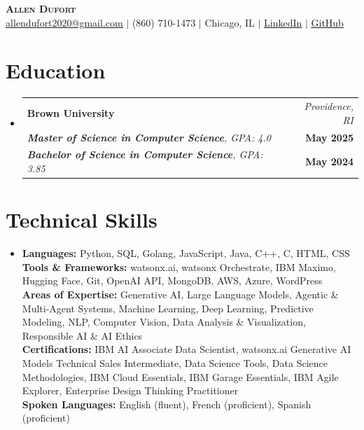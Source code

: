 \documentclass[letterpaper,10.9pt]{article}
\makeatletter
\newcommand{\resumeEdHeading}[6]{
  \item
  \begin{tabular*}{\textwidth}{l@{\extracolsep{\fill}}r}
    \textbf{#1} & \textit{\small #2} \\
    \textit{#3} & \textbf{\small #4} \\
    \textit{#5} & \textbf{\small #6} \\
  \end{tabular*}\vspace{-7pt}
}
\newcommand{\resumeSubHeadingListStart}{\begin{itemize}[leftmargin=0in, label={}]}
\newcommand{\resumeSubHeadingListEnd}{\end{itemize}}
\newcommand{\resumeItemListStart}{\begin{itemize}}
\newcommand{\resumeItemListEnd}{\end{itemize}\vspace{-5pt}}
\makeatother
\begin{document}
\begin{center}
  \textbf{\Huge \scshape Allen Dufort} \\ \vspace{8pt}
  \href{mailto:allendufort2020@gmail.com}{\faEnvelope \thinspace \thinspace \underline{allendufort2020@gmail.com}} $|$
  \faPhone \thinspace \thinspace (860) 710-1473 $|$
  \faMapMarker* \thinspace \thinspace Chicago, IL $|$
  \href{https://www.linkedin.com/in/allen-dufort/}{\faLinkedin \thinspace \thinspace \underline{LinkedIn}} $|$
  \href{https://github.com/AllenDufort}{\faGithub \thinspace \thinspace \underline{GitHub}}
\end{center}

\section{Education}
\resumeSubHeadingListStart
  \resumeEdHeading
    {Brown University}{Providence, RI}
    {\textbf{Master of Science in Computer Science}, GPA: 4.0}{May 2025}
    {\textbf{Bachelor of Science in Computer Science}, GPA: 3.85}{May 2024}
\resumeSubHeadingListEnd

\section{Technical Skills}
\resumeItemListStart[leftmargin=0in, label={}]
  \item{
    \textbf{Languages:}\small{ Python, SQL, Golang, JavaScript, Java, C++, C, HTML, CSS} \\
    \textbf{Tools \& Frameworks:}\small{ watsonx.ai, watsonx Orchestrate, IBM Maximo, Hugging Face, Git, OpenAI API, MongoDB, AWS, Azure, WordPress} \\
    \textbf{Areas of Expertise:}\small{ Generative AI, Large Language Models, Agentic \& Multi-Agent Systems, Machine Learning, Deep Learning, Predictive Modeling, NLP, Computer Vision, Data Analysis \& Visualization, Responsible AI \& AI Ethics} \\
    \textbf{Certifications:}\small{ IBM AI Associate Data Scientist, watsonx.ai Generative AI Models Technical Sales Intermediate, Data Science Tools, Data Science Methodologies, IBM Cloud Essentials, IBM Garage Essentials, IBM Agile Explorer, Enterprise Design Thinking Practitioner} \\
    \textbf{Spoken Languages:}\small{ English (fluent), French (proficient), Spanish (proficient)} \\
  }
\resumeItemListEnd\vspace{-7pt}
\end{document}
